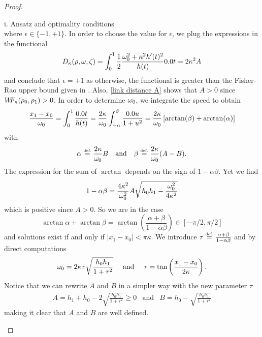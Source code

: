 \begin{proof}
\begin{paragraph}{i. Ansatz and optimality conditions}
\[\]
where $\epsilon \in \{ -1,+1\}$. In order to choose the value for $\epsilon$, we plug the expressions in the functional
\begin{equation}
\label{link distance A}
\ifonc(\rho,\M,\Z)=\int_0^1 \frac12 \frac{\M_0^2+\kappa^2 h'(t)^2}{h(t)} \d t = 2 \kappa^2 A
\end{equation}
and conclude that $\epsilon=+1$ as otherwise, the functional is greater than the Fisher-Rao upper bound given in . Also, \eqref{link distance A} shows that $A>0$ since $W\! \! F_{\kappa}(\rho_0,\rho_1)>0$. In order to determine $\omega_0$, we integrate the speed to obtain
\[
\frac{x_1-x_0}{\M_0}
=\int_0^1 \frac{\d t}{h(t)}
=\frac{2\kappa}{\M_0} \int_{-\alpha}^{\beta} \frac{\d u}{1+u^2}
=\frac{2\kappa}{\M_0} \left[ \arctan(\beta)+ \arctan(\alpha) \right]
\]
with 
\begin{equation}
\label{alpha,beta}
\alpha \defeq \frac{2\kappa}{\M_0}B 
\quad \text{and} \quad 
\beta \defeq \frac{2\kappa}{\M_0}(A-B).
\end{equation}
The expression for the sum of $\arctan$ depends on the sign of $1-\alpha \beta$. Yet we find
\[
1-\alpha \beta = \frac{4\kappa^2}{\omega_0^2}A\sqrt{h_0h_1-\frac{\omega_0^2}{4\kappa^2}}
\]
which is positive since $A>0$. So we are in the case 
\[
\arctan \alpha + \arctan \beta = \arctan \left( \frac{\alpha+\beta}{1-\alpha \beta} \right) \in [-\pi/2,\pi/2]
\]
and solutions exist if and only if $|x_1-x_0|< \pi \kappa$. We introduce $\tau \stackrel{\mbox{\upshape\tiny def.}}{=} \frac{\alpha + \beta}{1- \alpha \beta}$ and by direct computations
\[
\omega_0 = 2 \kappa \tau \sqrt{\frac{h_0 h_1}{1+\tau^2}}
\quad \text{ and } \quad 
\tau = \tan \left( \frac{x_1-x_0}{2\kappa} \right).
\]
Notice that we can rewrite $A$ and $B$ in a simpler way with the new parameter $\tau$
\begin{eqnarray*}
A= h_1 +h_0 - 2\sqrt{\frac{h_0 h_1}{1+\tau^2}} \geq 0 & \text{and} & B= h_0 -  \sqrt{\frac{h_0 h_1}{1+\tau^2}}
\end{eqnarray*}
making it clear that $A$ and $B$ are well defined.


\end{paragraph}
\end{proof}

